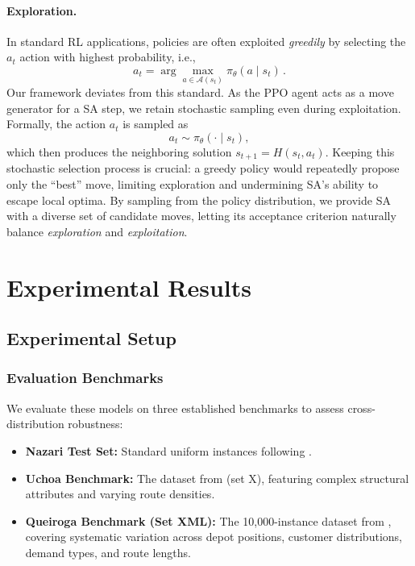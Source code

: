 \documentclass[letterpaper]{article} %
\begin{document}
\paragraph{Exploration.}

In standard RL applications, policies are often exploited \textit{greedily} by selecting the $a_t$ action with highest probability, i.e.,
$$
a_t = \arg \max_{a \in \mathcal{A}(s_t)} \pi_{\theta}(a \mid s_t) \,.
$$
Our framework deviates from this standard. As the PPO agent acts as a move generator for a SA step, we retain stochastic sampling even during exploitation. Formally, the action $a_t$ is sampled as
\begin{equation*}
a_t \sim \pi_{\theta}(\cdot \mid s_t),
\end{equation*}
which then produces the neighboring solution $s_{t+1} = H(s_t, a_t)$. 
Keeping this stochastic selection process is crucial: a greedy policy would repeatedly propose only the ``best'' move, limiting exploration and undermining SA's ability to escape local optima. By sampling from the policy distribution, we provide SA with a diverse set of candidate moves, letting its acceptance criterion naturally balance \textit{exploration} and \textit{exploitation}.

\section{Experimental Results}
\label{sec:experiments}

\subsection{Experimental Setup}

\subsubsection{Evaluation Benchmarks}
We evaluate these models on three established benchmarks to assess cross-distribution robustness:
\begin{itemize}
    \item \textbf{Nazari Test Set:} Standard uniform instances following \citep{nazari_reinforcement_2018}.
    \item \textbf{Uchoa Benchmark:} The dataset from \citep{uchoa_new_2017} (set X), featuring complex structural attributes and varying route densities.
    \item \textbf{Queiroga Benchmark (Set XML):} The 10,000-instance dataset from \citep{queiroga_10000_nodate}, covering systematic variation across depot positions, customer distributions, demand types, and route lengths.
\end{itemize}
\end{document}
